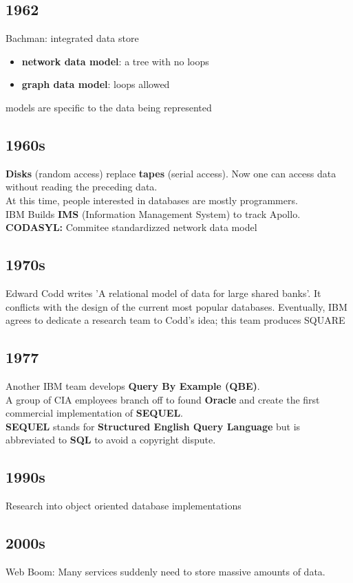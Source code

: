 \documentclass{article}
\begin{document}
\subsection*{1962}
Bachman: integrated data store
\begin{itemize}
    \item \textbf{network data model}: a tree with no loops
    \item \textbf{graph data model}: loops allowed
\end{itemize}
models are specific to the data being represented
\subsection*{1960s}
\textbf{Disks} (random access) replace \textbf{tapes} (serial access).
Now one can access data without reading the preceding data.\\
At this time, people interested in databases are mostly programmers.\\
IBM Builds \textbf{IMS} (Information Management System) to track Apollo.\\
\textbf{CODASYL:} Commitee standardizzed network data model

\subsection*{1970s} Edward Codd writes 'A relational model of data for large
shared banks'.  It conflicts with the design of the current most popular
databases.  Eventually, IBM agrees to dedicate a research team to Codd's idea;
this team produces SQUARE

\subsection*{1977}
Another IBM team develops \textbf{Query By Example (QBE)}.\\
A group of CIA employees branch off to found \textbf{Oracle} and create the
first commercial implementation of \textbf{SEQUEL}.\\
\textbf{SEQUEL} stands for \textbf{Structured English Query Language} but is
abbreviated to \textbf{SQL} to avoid a copyright dispute.

\subsection*{1990s}
Research into object oriented database implementations

\subsection*{2000s}
Web Boom: Many services suddenly need to store massive amounts of data.
\end{document}
